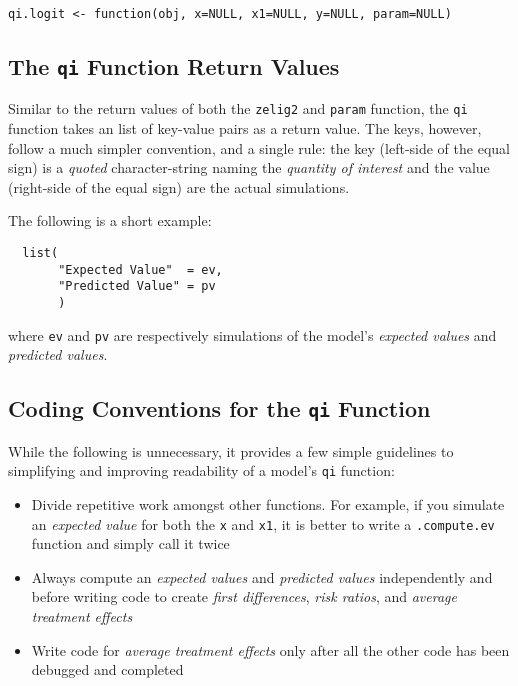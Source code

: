 \documentclass{article}
\newcommand{\code}[1]{{\tt #1}}
\begin{document}
\begin{verbatim}
qi.logit <- function(obj, x=NULL, x1=NULL, y=NULL, param=NULL)
\end{verbatim}



\subsection{The \code{qi} Function Return Values}

Similar to the return values of both the \code{zelig2} and \code{param} function,
the \code{qi} function takes an list of key-value pairs as a return value. The keys,
however, follow a much simpler convention, and a single rule: the key (left-side
of the equal sign) is a \emph{quoted} character-string naming the \emph{quantity of
interest} and the value (right-side of the equal sign) are the actual simulations.

The following is a short example:

\begin{verbatim}
  list(
       "Expected Value"  = ev,
       "Predicted Value" = pv
       )
\end{verbatim}

\noindent where \code{ev} and \code{pv} are respectively simulations of the model's
\emph{expected values} and \emph{predicted values}.

\subsection{Coding Conventions for the \code{qi} Function}

While the following is unnecessary, it provides a few simple guidelines to simplifying
and improving readability of a model's \code{qi} function:

\begin{itemize}

	\item Divide repetitive work amongst other functions. For example, if you simulate
		an \emph{expected value} for both the \code{x} and \code{x1}, it is better to 
		write a \code{.compute.ev} function and simply call it twice
		
	\item Always compute an \emph{expected values} and \emph{predicted values} independently
		and before writing code to create \emph{first differences}, \emph{risk ratios}, and
		\emph{average treatment effects}
		
	\item Write code for \emph{average treatment effects} only after all the other code has
		been debugged and completed

\end{itemize}
\end{document}
